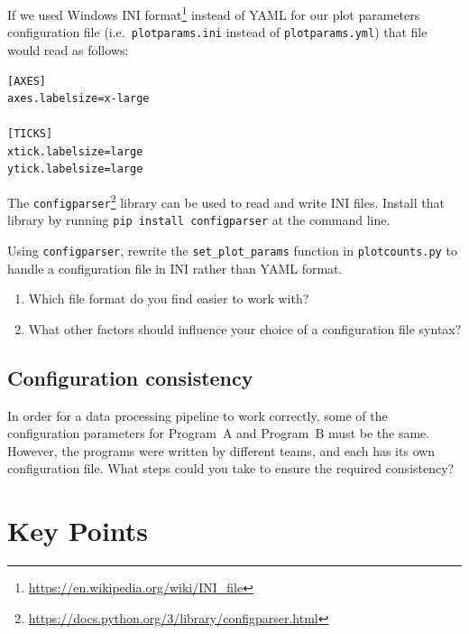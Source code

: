 \documentclass[
]{krantz}
\providecommand{\tightlist}{%
  \setlength{\itemsep}{0pt}\setlength{\parskip}{0pt}}
\renewcommand{\href}[2]{#2\footnote{\url{#1}}}
\begin{document}
If we used \href{https://en.wikipedia.org/wiki/INI_file}{Windows INI format} instead of YAML
for our plot parameters configuration file
(i.e.~\texttt{plotparams.ini} instead of \texttt{plotparams.yml})
that file would read as follows:

\begin{verbatim}
[AXES]
axes.labelsize=x-large

[TICKS]
xtick.labelsize=large
ytick.labelsize=large
\end{verbatim}

The \href{https://docs.python.org/3/library/configparser.html}{\texttt{configparser}} library can be used to read and write INI files.
Install that library by running \texttt{pip\ install\ configparser} at the command line.

Using \texttt{configparser}, rewrite the \texttt{set\_plot\_params} function in \texttt{plotcounts.py} to
handle a configuration file in INI rather than YAML format.

\begin{enumerate}
\def\labelenumi{\arabic{enumi}.}
\tightlist
\item
  Which file format do you find easier to work with?
\item
  What other factors should influence your choice of a configuration file syntax?
\end{enumerate}

\hypertarget{config-ex-consistency}{%
\subsection{Configuration consistency}\label{config-ex-consistency}}

In order for a data processing pipeline to work correctly,
some of the configuration parameters for Program~A and Program~B must be the same.
However,
the programs were written by different teams,
and each has its own configuration file.
What steps could you take to ensure the required consistency?

\hypertarget{config-keypoints}{%
\section{Key Points}\label{config-keypoints}}
\end{document}

